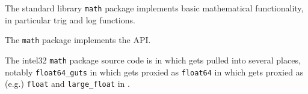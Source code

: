 
The standard library {\tt math} package implements basic mathematical functionality, 
in particular trig and log functions.

The {\tt math} package implements the  API.

The intel32 {\tt math} package source code is in  
which gets pulled into several places, notably 
{\tt float64\_guts} in  
which gets proxied as {\tt float64} in 
 which gets 
proxied as (e.g.) {\tt float} and {\tt large\_float} in 
.

